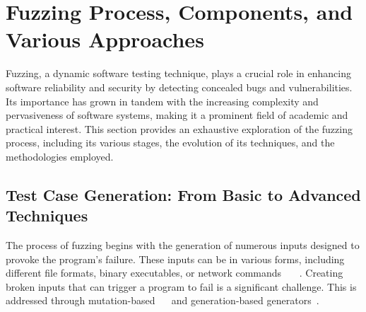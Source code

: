 

\section{Fuzzing Process, Components, and Various Approaches}\label{sec:fuzzing_methods}
Fuzzing, a dynamic software testing technique, plays a crucial role in enhancing
software reliability and security by detecting concealed bugs and
vulnerabilities. Its importance has grown in tandem with the increasing
complexity and pervasiveness of software systems, making it a prominent
field of academic and practical interest. This section provides an exhaustive
exploration of the fuzzing process, including its various stages, the evolution
of its techniques, and the methodologies employed.

\subsection{Test Case Generation: From Basic to Advanced Techniques}
The process of fuzzing begins with the generation of numerous inputs
designed to provoke the program's failure. These inputs can be in various forms,
including different file formats, binary executables, or network commands
~\cite{mcnally2012fuzzing}~\cite{bohme2020fuzzing}~\cite{manes2019art}.
Creating broken inputs that can trigger a program to fail is a
significant challenge. This is addressed through mutation-based
~\cite{miller2007analysis}~\cite{lyu2022ems} and
generation-based generators~\cite{pang2023generation}.

